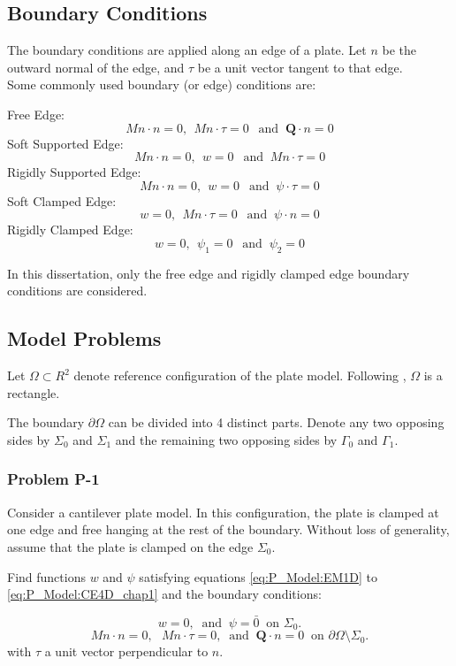 \documentclass[../../main.tex]{subfiles}
\begin{document}
	\subsection{Boundary Conditions}\label{ssec:P_Model:BoundaryConditions}
	The boundary conditions are applied along an edge of a plate. Let $n$ be the outward normal of the edge, and $\tau$ be a unit vector tangent to that edge.\\
	
	Some commonly used boundary (or edge) conditions are:
	
	Free Edge:
	\[Mn\cdot n = 0, \ \ Mn\cdot \tau = 0 \ \ \textrm{ and }\ \mathbf{Q}\cdot n = 0 \]
	Soft Supported Edge:
	\[Mn\cdot n = 0, \ \ w = 0 \ \ \textrm{ and } \ Mn \cdot \tau = 0 \]
	Rigidly Supported Edge:
	\[Mn\cdot n = 0, \ \ w = 0 \ \ \textrm{ and } \ {\psi} \cdot \tau = 0 \]
	Soft Clamped Edge:
	\[w = 0, \ \ Mn \cdot \tau = 0 \ \ \textrm{ and } \ \psi \cdot n = 0 \]
	Rigidly Clamped Edge:
	\[w = 0, \ \ \psi_1 = 0 \ \ \textrm{ and } \ \psi_2 = 0 \]
	
	In this dissertation, only the free edge and rigidly clamped edge boundary conditions are considered.
	
	\subsection{Model Problems}\label{ssec:P_Model:ModelProblems}
	Let $\Omega \subset R^2$ denote reference configuration of the plate model. Following \cite{Wu06}, $\Omega$ is a rectangle.
	
	The boundary $\partial \Omega$ can be divided into 4 distinct parts. Denote any two opposing sides by $\Sigma_0$ and $\Sigma_1$ and the remaining two opposing sides by $\Gamma_0$ and $\Gamma_1$.
	
	\subsubsection{Problem P-1}\label{sssec:P_Model:ProblemP1}
	Consider a cantilever plate model. In this configuration, the plate is clamped at one edge and free hanging at the rest of the boundary. Without loss of generality, assume that the plate is clamped on the edge $\Sigma_0$.

	Find functions $w$ and $\psi$ satisfying equations \eqref{eq:P_Model:EM1D} to \eqref{eq:P_Model:CE4D_chap1} and the boundary conditions:
	
	\[w = 0,  \ \textrm{ and } \ \psi = \bar{0} \ \textrm{ on } \Sigma_0.\]
	\[Mn\cdot n = 0,\ \ \ Mn\cdot \tau = 0, \ \textrm{ and } \ \mathbf{Q} \cdot n =0 \ \textrm{ on } \partial\Omega\setminus\Sigma_0.\]
	with $\tau$ a unit vector perpendicular to $n$. 
	
\end{document}
